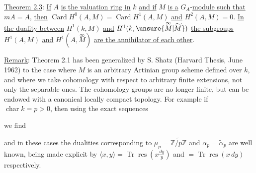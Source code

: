 
\uline{Theorem 2.3}: \uline{If} $A$ \uline{is the valuation ring in} $k$ \uline{and if} $M$ \uline{is a} $G_A$-\uline{module such that} $mA=A$, \uline{then} $\operatorname{Card}H^0(A,M)=\operatorname{Card}H^1(A,M)$ \uline{and} $H^2(A,M)=0$. \uline{In the duality between} $H^1(k,M)$ \uline{and} $H^1(k,\unsure{\overset{\infty}{M}|\widetilde M})$ \uline{the subgroups} $H^1(A,M)$ \uline{and} $H^1(A,\overset{\infty}{M})$ \uline{are the annihilator of each other}.

\uline{Remark}: Theorem 2.1 has been generalized by S. Shatz (Harvard Thesis, June 1962) to the case where $M$ is an arbitrary Artinian  group scheme defined over $k$, and where we take cohomology with respect to arbitrary finite extensions, not only the separable ones.  The cohomology groups are no longer finite, but can be endowed with a canonical locally compact topology. For example if $\operatorname{char}k=p>0$, then using the exact sequences


we find
\diagram{\[\begin{array}{lll}
H^0(k,\mu_p)=0&H^0(k,\alpha_p)=0&H^0(k,\mathbb Z/p\mathbb Z)=\mathbb Z/p\mathbb Z\\
H^1(k,\mu_p)=k^*/k^{*p}\ \text{(compact)}&
H^1(k,\alpha_p)=k/k^p\ \text{(locally compact)}&
H^1(k,\mathbb Z/p\mathbb Z)=k/\wp k\ \text{(discrete)}\\
H^2(k,\mu_p)=\frac1p\mathbb Z/\mathbb Z&H^2(k,\alpha_p)=0&H^2(k,\mathbb Z/p\mathbb Z)=0
\end{array}\]}

and in these cases the dualities corresponding to $\mu_p=\widetilde{\mathbb Z/p\mathbb Z}$ and $\alpha_p=\widetilde\alpha_p$ are well known, being made explicit by $\langle x,y\rangle=\operatorname{Tr}\operatorname{res}(x\frac{dy}{y})$ and $=\operatorname{Tr}\operatorname{res}(x\,dy)$ respectively.

